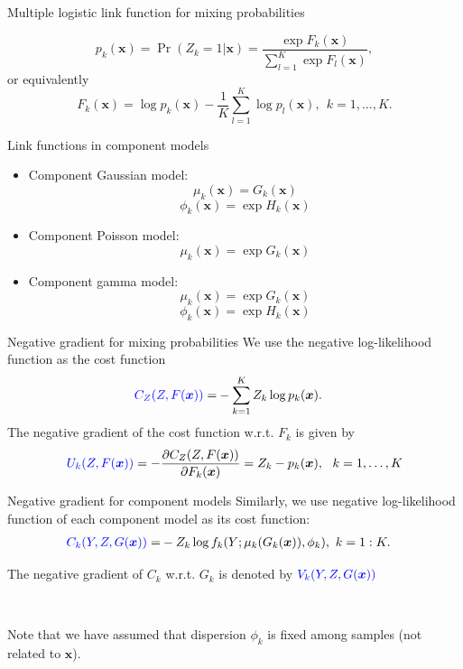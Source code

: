 \documentclass[professionalfont]{beamer}
\def\bx{\boldsymbol{x}}
\newcommand{\blue}[1]{\textcolor{blue}{#1}}
\begin{document}
	
\begin{frame}{Multiple logistic link function for mixing probabilities}


	 \begin{equation}\label{logistic}
	 	p_k(\bx)=\Pr(Z_k=1|\bx)=\frac{\exp{F_k(\bx)}}{\sum_{l=1}^{K}\exp{F_l(\bx)}}, 
	 \end{equation}
	 or equivalently
	 \begin{equation}\label{inv-logistic}
	 	F_k(\bx)=\log p_k(\bx)-\frac{1}{K}\sum_{l=1}^K\log p_l(\bx),~~k=1,\ldots,K.
	 \end{equation}
\end{frame}

\begin{frame}{Link functions in component models}
	
 	\begin{itemize}
 \item Component Gaussian model:
  $$\mu_k(\bx)=G_k(\bx)$$
  $$\phi_k(\bx)=\exp H_k(\bx)$$
	 \item Component Poisson model:
	 $$\mu_k(\bx)=\exp G_k(\bx)$$
	 \item Component gamma model:
	 $$\mu_k(\bx)=\exp G_k(\bx)$$
	   $$\phi_k(\bx)=\exp H_k(\bx)$$
	\end{itemize}
\end{frame}

\begin{frame}{Negative gradient for mixing probabilities}
	We use the negative log-likelihood function as the cost function 
	\begin{equation}
		\begin{aligned}
			\blue{C_{Z}(Z, F(\bx))}=& - \sum_{k=1}^K Z_k \log p_k(\bx).
		\end{aligned}
	\end{equation}
	The negative gradient of the cost function w.r.t. $F_k$ is given by
	\begin{equation}
		\blue{U_k(Z,F(\bx))}=-\frac{\partial C_{Z}(Z,F(\bx))}{\partial F_k(\bx)}=
		Z_k-p_k(\bx), ~~k=1,\ldots,K
	\end{equation}
\end{frame}

\begin{frame}{Negative gradient for component models}
	Similarly, we use negative log-likelihood function of each component model as its cost function:
	\begin{equation}
		\begin{aligned}
			\blue{C_k(Y,Z,G(\bx))}=& -Z_k\log f_k(Y;\mu_k(G_k(\bx)),\phi_k), ~ k=1:K.
		\end{aligned}
	\end{equation}

The negative gradient of $C_k$ w.r.t. $G_k$ is denoted by $\blue{V_k(Y,Z,G(\bx))}$

~

Note that we have assumed that dispersion $\phi_k$ is fixed among samples (not related to $\bx$).
\end{frame}
\end{document}
